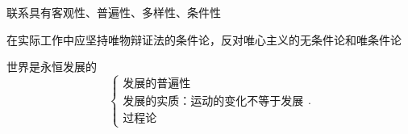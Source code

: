 \begin{notation}
    联系具有客观性、普遍性、多样性、条件性
\end{notation}
在实际工作中应坚持唯物辩证法的条件论，反对唯心主义的无条件论和唯条件论

\begin{notation}
    世界是永恒发展的
    \[
        \begin{cases}
            \text{发展的普遍性}\\
            \text{发展的实质：运动的变化不等于发展}\\
            \text{过程论}
        \end{cases}
    .\] 
\end{notation}

